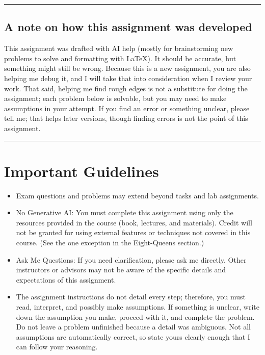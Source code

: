\documentclass[11pt]{article}
\begin{document}
\AssignmentTitleBlock

\begin{center}
\rule{0.95\linewidth}{0.6pt}
\end{center}
\subsection*{A note on how this assignment was developed}
\noindent
This assignment was drafted with AI help (mostly for brainstorming new
problems to solve and formatting with LaTeX). It should be accurate, but
something might still be wrong.
Because this is a new assignment, you are also helping me debug it, and I
will take that into consideration when I review your work. That said,
helping me find rough edges is not a substitute for doing the assignment;
each problem below is solvable, but you may need to make assumptions in
your attempt. If you find an error or
something unclear, please tell me; that helps later versions, though
finding errors is not the point of this assignment.
\begin{center}
\rule{0.95\linewidth}{0.6pt}
\end{center}
\vspace{0.6em}

\section{Important Guidelines}
\begin{itemize}[leftmargin=1.4em]
  \item Exam questions and problems may extend beyond tasks and lab assignments.
  \item No Generative AI: You must complete this assignment using only the
        resources provided in the course (book, lectures, and materials).
        Credit will not be granted for using external features or techniques
        not covered in this course. (See the one exception in the
        Eight-Queens section.)
  \item Ask Me Questions: If you need clarification, please ask me directly.
        Other instructors or advisors may not be aware of the specific
        details and expectations of this assignment.
  \item The assignment instructions do not detail every step; therefore, you
        must read, interpret, and possibly make assumptions. If something is
        unclear, write down the assumption you make, proceed with it, and
        complete the problem. Do not leave a problem unfinished because a
        detail was ambiguous. Not all assumptions are automatically correct,
        so state yours clearly enough that I can follow your reasoning.
\end{itemize}
\end{document}
